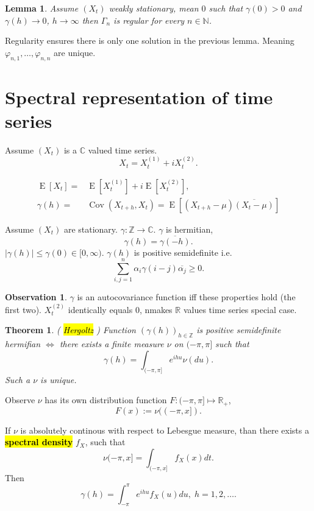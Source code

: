 \documentclass[12pt,a4paper, notitlepage]{book}
\newcommand{\hlc}[2][yellow]{ {\sethlcolor{#1} \hl{#2}} }
\newcommand{\hlcr}[1]{\hlc[lightred]{#1}}
\theoremstyle{definition} %
\newtheorem{observation}[definition]{Observation}
\theoremstyle{plain} %
\newtheorem{lemma}[definition]{Lemma}
\newtheorem{theorem}[definition]{Theorem}
\newcommand{\R}{\mathbb R}
\newcommand{\N}{\mathbb N}
\newcommand{\Z}{\mathbb Z}
\newcommand{\C}{\mathbb C}
\DeclareMathOperator{\Cov}{Cov}
\DeclareMathOperator{\E}{E}
\newcommand{\New}[1]{ {\bf \hlcr{#1} } }
\newcommand{\Important}[1]{ {\it \hlc{#1} } }
\begin{document}
\begin{lemma}
Assume $(X_t)$ weakly stationary, mean $0$ such that $\gamma(0) > 0$ and $\gamma(h) \rightarrow 0$, $h \rightarrow \infty$ then $\Gamma_n$ is regular for every $n \in \N$. 
\end{lemma}

Regularity ensures there is only one solution in the previous lemma. Meaning $\varphi_{n,1}, \dots, \varphi_{n,n}$ are unique. 


\section{ Spectral representation of time series}

Assume $(X_t)$ is a $\C$ valued time series.
\[ X_t = X_t^{(1)} + i X_t^{(2)} . \]

\begin{align*} \E[X_t] = & \E[X_t^{(1)}] + i \E[X_t^{(2)} ] , \\ 
\gamma(h) = & \Cov(X_{t+h}, X_t) = \E[ (X_{t+h} - \mu)\overline{(X_t - \mu)} ] \end{align*}

Assume $(X_t)$ are stationary. $\gamma: \Z \rightarrow \C$. $\gamma$ is hermitian, 
\[ \gamma(h) = \overline{\gamma(-h)}. \]  $|\gamma(h)| \leq \gamma(0) \in [0, \infty)$. $\gamma(h)$ is positive semidefinite i.e.
\[ \sum_{i,j = 1}^n \alpha_i \gamma(i-j)\overline{\alpha_j} \geq 0. \]

\begin{observation}
$\gamma$ is an autocovariance function iff these properties hold (the first two).
$X_t^{(2)}$ identically equals $0$, nmakes $\R$ values time series special case. 
\end{observation}

\begin{theorem} (\Important{Hergoltz})
Function $(\gamma(h))_{h \in\Z}$ is positive semidefinite hermifian $\iff $ there exists a finite measure $\nu$ on $(-\pi, \pi]$ such that 
\[ \gamma(h) = \int_{(-\pi,\pi]} e^{i h u}\nu(du). \] 
Such a $\nu$ is unique.
\end{theorem}

Observe $\nu$ has its own distribution function $F : (-\pi, \pi] \mapsto \R_+$, 
\[ F(x) := \nu((-\pi,x]) . \]


If $\nu$ is absolutely continous with respect to Lebesgue measure, than there exists a \New{ spectral density} $f_X$, such that \[ \nu(-\pi, x] = \int_{(-\pi,x]}f_X(x) dt. \]
 Then 
\[ \gamma(h) = \int_{-\pi}^\pi e^{i h u}f_X(u) du , \; h = 1,2, \dots. \]
\end{document}
